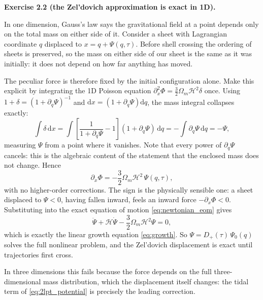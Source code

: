 \documentclass[a4paper,11pt]{article}
\def\cH{\mathcal{H}}
\newcommand{\dd}{\mathrm{d}}
\def\Om{\Omega_m}
\newenvironment{solution}[1]
  {\par\medskip\noindent\textbf{#1}\par\nobreak\smallskip}
  {\par\medskip}
\begin{document}
\begin{solution}{Exercise 2.2 (the Zel'dovich approximation is exact in 1D).}
In one dimension, Gauss's law says the gravitational field at a point depends
only on the total mass on either side of it. Consider a sheet with Lagrangian
coordinate $q$ displaced to $x = q + \Psi(q,\tau)$. Before shell crossing the
ordering of sheets is preserved, so the mass on either side of our sheet is the
same as it was initially: it does not depend on how far anything has moved.

The peculiar force is therefore fixed by the initial configuration alone. Make
this explicit by integrating the 1D Poisson equation
$\partial_x^2\Phi = \tfrac32\Om\cH^2\delta$ once. Using
$1 + \delta = (1 + \partial_q\Psi)^{-1}$ and $\dd x = (1+\partial_q\Psi)\dd q$,
the mass integral collapses exactly:
\begin{equation*}
\int \delta\,\dd x
= \int \left[\frac{1}{1+\partial_q\Psi} - 1\right](1+\partial_q\Psi)\,\dd q
= -\int \partial_q\Psi\,\dd q = -\Psi ,
\end{equation*}
measuring $\Psi$ from a point where it vanishes. Note that every power of
$\partial_q\Psi$ cancels: this is the algebraic content of the statement that the
enclosed mass does not change. Hence
\begin{equation*}
\partial_x\Phi = -\frac{3}{2}\Om\cH^2\,\Psi(q,\tau) ,
\end{equation*}
with no higher-order corrections. The sign is the physically sensible one: a
sheet displaced to $\Psi < 0$, having fallen inward, feels an inward force
$-\partial_x\Phi < 0$. Substituting into the exact equation of motion
\eqref{eq:newtonian_eom} gives
\begin{equation*}
\ddot\Psi + \cH\dot\Psi - \frac{3}{2}\Om\cH^2\Psi = 0 ,
\end{equation*}
which is exactly the linear growth equation \eqref{eq:growth}. So
$\Psi = D_+(\tau)\,\Psi_0(q)$ solves the full nonlinear problem, and the
Zel'dovich displacement is exact until trajectories first cross.

In three dimensions this fails because the force depends on the full
three-dimensional mass distribution, which the displacement itself changes: the
tidal term of \eqref{eq:2lpt_potential} is precisely the leading correction.
\end{solution}
\end{document}
